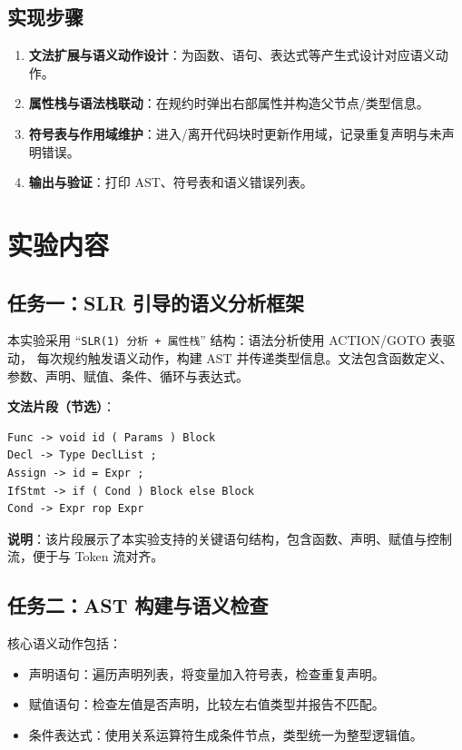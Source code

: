\documentclass[12pt,a4paper]{ctexart}
\begin{document}
\subsection{实现步骤}
\begin{enumerate}
	\item \textbf{文法扩展与语义动作设计}：为函数、语句、表达式等产生式设计对应语义动作。
	\item \textbf{属性栈与语法栈联动}：在规约时弹出右部属性并构造父节点/类型信息。
	\item \textbf{符号表与作用域维护}：进入/离开代码块时更新作用域，记录重复声明与未声明错误。
	\item \textbf{输出与验证}：打印 AST、符号表和语义错误列表。
\end{enumerate}

\section{实验内容}
\subsection{任务一：SLR 引导的语义分析框架}
本实验采用 ``\texttt{SLR(1) 分析 + 属性栈}'' 结构：语法分析使用 ACTION/GOTO 表驱动，
每次规约触发语义动作，构建 AST 并传递类型信息。文法包含函数定义、参数、声明、赋值、条件、循环与表达式。

\textbf{文法片段（节选）}：
\begin{verbatim}
Func -> void id ( Params ) Block
Decl -> Type DeclList ;
Assign -> id = Expr ;
IfStmt -> if ( Cond ) Block else Block
Cond -> Expr rop Expr
\end{verbatim}
\textbf{说明}：该片段展示了本实验支持的关键语句结构，包含函数、声明、赋值与控制流，便于与 Token 流对齐。

\subsection{任务二：AST 构建与语义检查}
核心语义动作包括：
\begin{itemize}
	\item 声明语句：遍历声明列表，将变量加入符号表，检查重复声明。
	\item 赋值语句：检查左值是否声明，比较左右值类型并报告不匹配。
	\item 条件表达式：使用关系运算符生成条件节点，类型统一为整型逻辑值。
\end{itemize}
\end{document}
